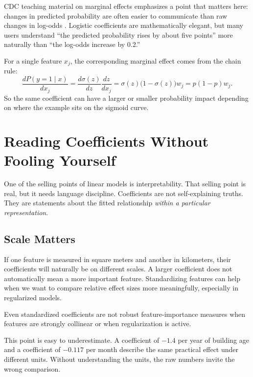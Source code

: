 \begin{example}
CDC teaching material on marginal effects emphasizes a point that matters here: changes in predicted probability are often easier to communicate than raw changes in log-odds \citep{cdc_marginal_effects}. Logistic coefficients are mathematically elegant, but many users understand ``the predicted probability rises by about five points'' more naturally than ``the log-odds increase by 0.2.''
\end{example}

For a single feature $x_j$, the corresponding marginal effect comes from the chain rule:
\[
\frac{dP(y=1\mid x)}{dx_j}
=\frac{d\sigma(z)}{dz}\frac{dz}{dx_j}
=\sigma(z)\bigl(1-\sigma(z)\bigr)w_j
=p(1-p)w_j.
\]
So the same coefficient can have a larger or smaller probability impact depending on where the example sits on the sigmoid curve.

\section{Reading Coefficients Without Fooling Yourself}

One of the selling points of linear models is interpretability. That selling point is real, but it needs language discipline. Coefficients are not self-explaining truths. They are statements about the fitted relationship \emph{within a particular representation}.

\subsection{Scale Matters}

If one feature is measured in square meters and another in kilometers, their coefficients will naturally be on different scales. A larger coefficient does not automatically mean a more important feature. Standardizing features can help when we want to compare relative effect sizes more meaningfully, especially in regularized models.

Even standardized coefficients are not robust feature-importance measures when features are strongly collinear or when regularization is active.

This point is easy to underestimate. A coefficient of $-1.4$ per year of building age and a coefficient of $-0.117$ per month describe the same practical effect under different units. Without understanding the units, the raw numbers invite the wrong comparison.

